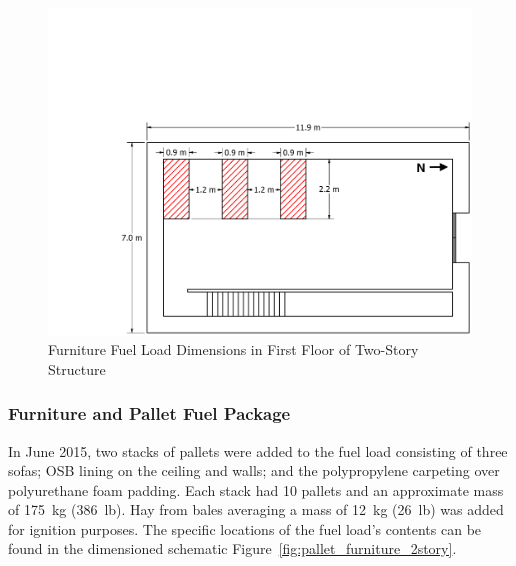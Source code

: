 \documentclass[12pt,oneside]{book}
\begin{document}
\begin{figure}[!ht]
	\includegraphics[width=\columnwidth]{../../DelCo_2014_2015/Drawings/PDFs/CAFS/West_Structure_1st_Floor_Furniture_Only}
	\caption{Furniture Fuel Load Dimensions in First Floor of Two-Story Structure}
	\label{fig:furniture_2story}
\end{figure}

\subsubsection{Furniture and Pallet Fuel Package}
\label{sec:fire_suppression_combo_fuel_2}

In June 2015, two stacks of pallets were added to the fuel load consisting of three sofas; OSB lining on the ceiling and walls; and the polypropylene carpeting over polyurethane foam padding. Each stack had 10 pallets and an approximate mass of 175~kg (386~lb). Hay from bales averaging a mass of 12~kg (26~lb) was added for ignition purposes. The specific locations of the fuel load's contents can be found in the dimensioned schematic Figure~\ref{fig:pallet_furniture_2story}.
\end{document}
